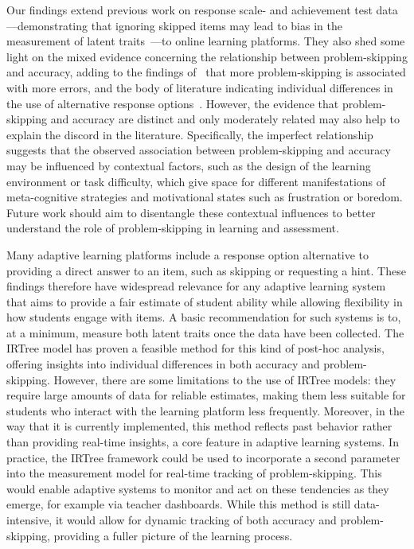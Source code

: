 \documentclass[12pt]{article}
\begin{document}
Our findings extend previous work on response scale- and achievement test data---demonstrating that ignoring skipped items may lead to bias in the measurement of latent traits~\parencite{holman2005modelling, pohl2014dealing, huang2020mixture, okumura2014empirical, debeer2017modeling}---to online learning platforms. They also shed some light on the mixed evidence concerning the relationship between problem-skipping and accuracy, adding to the findings of~\textcite{norum2024student} that more problem-skipping is associated with more errors, and the body of literature indicating individual differences in the use of alternative response options~\parencite{norum2024student, goldin2012learner, goldin2013hints}. However, the evidence that problem-skipping and accuracy are distinct and only moderately related may also help to explain the discord in the literature. Specifically, the imperfect relationship suggests that the observed association between problem-skipping and accuracy may be influenced by contextual factors, such as the design of the learning environment or task difficulty, which give space for different manifestations of meta-cognitive strategies and motivational states such as frustration or boredom. Future work should aim to disentangle these contextual influences to better understand the role of problem-skipping in learning and assessment. 

Many adaptive learning platforms include a response option alternative to providing a direct answer to an item, such as skipping or requesting a hint. These findings therefore have widespread relevance for any adaptive learning system that aims to provide a fair estimate of student ability while allowing flexibility in how students engage with items. A basic recommendation for such systems is to, at a minimum, measure both latent traits once the data have been collected. The IRTree model has proven a feasible method for this kind of post-hoc analysis, offering insights into individual differences in both accuracy and problem-skipping. However, there are some limitations to the use of IRTree models: they require large amounts of data for reliable estimates, making them less suitable for students who interact with the learning platform less frequently. Moreover, in the way that it is currently implemented, this method reflects past behavior rather than providing real-time insights, a core feature in adaptive learning systems. In practice, the IRTree framework could be used to incorporate a second parameter into the measurement model for real-time tracking of problem-skipping. This would enable adaptive systems to monitor and act on these tendencies as they emerge, for example via teacher dashboards. While this method is still data-intensive, it would allow for dynamic tracking of both accuracy and problem-skipping, providing a fuller picture of the learning process. 
\end{document}
